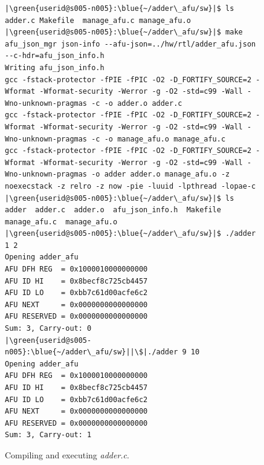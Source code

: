 \documentclass[11pt, twoside, pdftex]{article}
\newcommand{\green}[1]{{\color{green}\sf{#1}}}
\newcommand{\blue}[1]{{\color{blue}\sf{#1}}}
\begin{document}
\begin{figure}[H]
\begin{center}
\begin{minipage}[h]{\textwidth}
\begin{lstlisting}[name=output]
|\green{userid@s005-n005}:\blue{~/adder\_afu/sw}|$ ls
adder.c Makefile  manage_afu.c manage_afu.o
|\green{userid@s005-n005}:\blue{~/adder\_afu/sw}|$ make
afu_json_mgr json-info --afu-json=../hw/rtl/adder_afu.json --c-hdr=afu_json_info.h
Writing afu_json_info.h
gcc -fstack-protector -fPIE -fPIC -O2 -D_FORTIFY_SOURCE=2 -Wformat -Wformat-security -Werror -g -O2 -std=c99 -Wall -Wno-unknown-pragmas -c -o adder.o adder.c
gcc -fstack-protector -fPIE -fPIC -O2 -D_FORTIFY_SOURCE=2 -Wformat -Wformat-security -Werror -g -O2 -std=c99 -Wall -Wno-unknown-pragmas -c -o manage_afu.o manage_afu.c
gcc -fstack-protector -fPIE -fPIC -O2 -D_FORTIFY_SOURCE=2 -Wformat -Wformat-security -Werror -g -O2 -std=c99 -Wall -Wno-unknown-pragmas -o adder adder.o manage_afu.o -z noexecstack -z relro -z now -pie -luuid -lpthread -lopae-c
|\green{userid@s005-n005}:\blue{~/adder\_afu/sw}|$ ls
adder  adder.c  adder.o  afu_json_info.h  Makefile  manage_afu.c  manage_afu.o
|\green{userid@s005-n005}:\blue{~/adder\_afu/sw}|$ ./adder 1 2
Opening adder_afu
AFU DFH REG  = 0x1000010000000000
AFU ID HI    = 0x8becf8c725cb4457
AFU ID LO    = 0xbb7c61d00acfe6c2
AFU NEXT     = 0x0000000000000000
AFU RESERVED = 0x0000000000000000
Sum: 3, Carry-out: 0
|\green{userid@s005-n005}:\blue{~/adder\_afu/sw}||\$|./adder 9 10
Opening adder_afu
AFU DFH REG  = 0x1000010000000000
AFU ID HI    = 0x8becf8c725cb4457
AFU ID LO    = 0xbb7c61d00acfe6c2
AFU NEXT     = 0x0000000000000000
AFU RESERVED = 0x0000000000000000
Sum: 3, Carry-out: 1
\end{lstlisting}
\end{minipage}
\caption{Compiling and executing {\it adder.c}.}
\label{fig:adder_output}
\end{center}
\end{figure}




 
\end{document}
